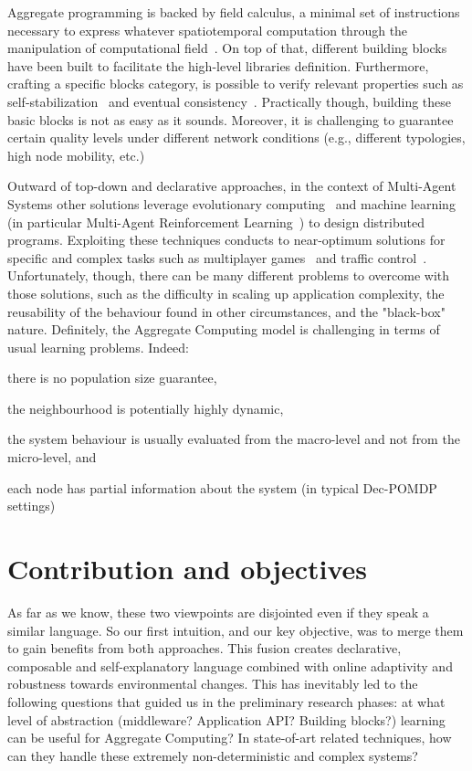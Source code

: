 \documentclass[conference]{IEEEtran}
\begin{document}
Aggregate programming is backed by field calculus, a minimal set of instructions necessary to express whatever spatiotemporal computation 
through the manipulation of computational field~\cite{DBLP:conf/coordination/AudritoBDV18}. 
On top of that, different building blocks have been built to facilitate the high-level libraries definition.
Furthermore, crafting a specific blocks category, is possible to verify relevant properties such as self-stabilization~\cite{DBLP:conf/coordination/ViroliD14} and eventual consistency~\cite{DBLP:conf/saso/BealVPD16}.
Practically though, building these basic blocks is not as easy as it sounds. 
Moreover, it is challenging to guarantee certain quality levels under different network conditions (e.g., different typologies, high node mobility, etc.)

Outward of top-down and declarative approaches, in the context of Multi-Agent Systems other solutions leverage evolutionary computing~\cite{DBLP:journals/swarm/BrambillaFBD13} and machine learning (in particular Multi-Agent Reinforcement Learning~\cite{DBLP:journals/tcyb/NguyenNN20}) to design distributed programs.
Exploiting these techniques conducts to near-optimum solutions for specific and complex tasks such as multiplayer games~\cite{DBLP:journals/nature/VinyalsBCMDCCPE19} and traffic control~\cite{DBLP:journals/aes/JinMK17}.
Unfortunately, though, there can be many different problems to overcome with those solutions, such as
the difficulty in scaling up application complexity, the reusability of the behaviour found in other circumstances, and the "black-box" nature. 
%
Definitely, the Aggregate Computing model is challenging in terms of usual learning problems. Indeed:
\begin{enumerate*}[label=(\roman*)]
\item there is no population size guarantee,
\item the neighbourhood is potentially highly dynamic,
\item the system behaviour is usually evaluated from the macro-level and not from the micro-level, and
\item each node has partial information about the system (in typical Dec-POMDP~\cite{DBLP:conf/uai/BernsteinZI00} settings)
\end{enumerate*}
\section{Contribution and objectives}
As far as we know, these two viewpoints are disjointed even if they speak a similar language. So our first intuition, and our key objective,
was to merge them to gain benefits from both approaches. This fusion creates declarative,
composable and self-explanatory language combined with online adaptivity and robustness towards environmental changes.
%
This has inevitably led to the following questions that guided us in the preliminary research phases: at what level of abstraction (middleware? Application API? Building blocks?) learning can be useful for Aggregate Computing? 
In state-of-art related techniques, how can they handle these extremely non-deterministic and complex systems?  
%
\end{document}
